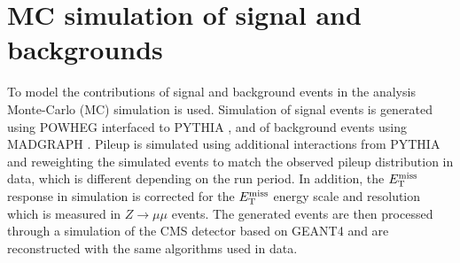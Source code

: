 \section{\ac{MC} simulation of signal and backgrounds}

To model the contributions of signal and background events in the analysis
Monte-Carlo (MC) simulation is used. Simulation of signal events is generated
using POWHEG \cite{powheg} interfaced to PYTHIA \cite{pythia}, and of
background events using MADGRAPH \cite{madgraph}. Pileup is simulated using
additional interactions from PYTHIA and reweighting the simulated events to
match the observed pileup distribution in data, which is different depending on
the run period. In addition, the $E_{\rm{T}}^{\rm{miss}}$ response in
simulation is corrected for the $E_{\rm{T}}^{\rm{miss}}$ energy scale and
resolution which is measured in $Z\rightarrow\mu\mu$ events. The generated
events are then processed through a simulation of the CMS detector based on
GEANT4 \cite{geant4} and are reconstructed with the same algorithms used in
data.



